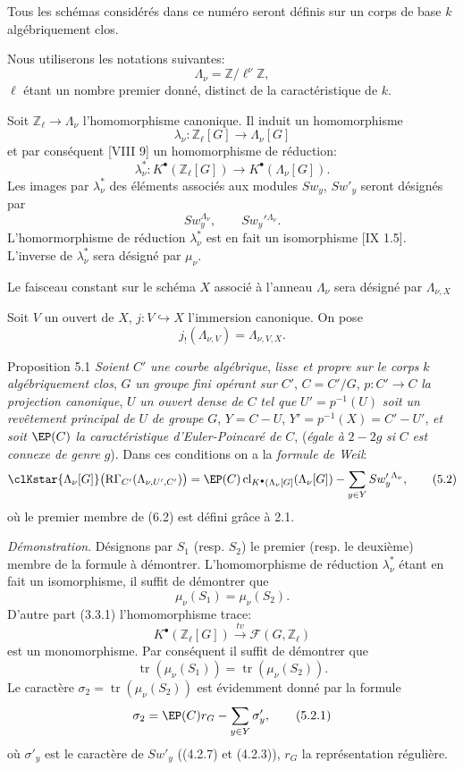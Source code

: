Tous les schémas considérés dans ce numéro seront définis sur un corps de base $k$ algébriquement clos.

Nous utiliserons les notations suivantes:
\[
\Lambda_\nu=\mathbb{Z}/\ell^\nu\mathbb{Z},
\]
$\ell$ étant un nombre premier donné, distinct de la caractéristique de $k$.

Soit $\mathbb{Z}_\ell\to\Lambda_\nu$ l'homomorphisme canonique. Il induit un homomorphisme
\[
\lambda_\nu:\mathbb{Z}_\ell[G]\longrightarrow \Lambda_\nu[G]
\]
et par conséquent [VIII 9] un homomorphisme de réduction:
\[
\lambda_\nu^*:K^{\bullet}(\mathbb{Z}_\ell[G])\longrightarrow K^{\bullet}(\Lambda_\nu[G]).
\]
Les images par $\lambda_\nu^*$ des éléments associés aux modules $Sw_y$, $Sw'_y$ seront désignés par
\[
Sw_y^{\Lambda_\nu},\qquad Sw_y'{}^{\Lambda_\nu}.
\]
L'homormorphisme de réduction $\lambda_\nu^*$ est en fait un isomorphisme [IX 1.5]. L'inverse de $\lambda_\nu^*$ sera désigné par $\mu_\nu$.

Le faisceau constant sur le schéma $X$ associé à l'anneau $\Lambda_\nu$ sera désigné par $\Lambda_{\nu,X}$

Soit $V$ un ouvert de $X$, $j:V\hookrightarrow X$ l'immersion canonique. On pose
\[
j_!(\Lambda_{\nu,V})=\Lambda_{\nu,V,X}.
\]

\begin{statement}{Proposition 5.1}
\emph{Soient} $C'$ \emph{une courbe algébrique}, \emph{lisse et propre sur le corps} $k$ \emph{algébriquement clos}, $G$ \emph{un groupe fini opérant sur} $C'$, $C=C'/G$, $p:C'\to C$ \emph{la projection canonique}, $U$ \emph{un ouvert dense de} $C$ \emph{tel que} $U'=p^{-1}(U)$ \emph{soit un revêtement principal de} $U$ \emph{de groupe} $G$, $Y=C-U$, $Y'=p^{-1}(X)=C'-U'$, \emph{et soit} $\EP(C)$ \emph{la caractéristique d'Euler-Poincaré de} $C$, (\emph{égale à} $2-2g$ \emph{si} $C$ \emph{est connexe de genre} $g$).
Dans ces conditions on a la \emph{formule de Weil}:
\[
\clKstar{\Lambda_\nu[G]}\bigl(\mathrm{R}\Gamma_{C'}(\Lambda_{\nu,U',C'})\bigr)
=
\EP(C)\operatorname{cl}_{K^{\bullet}(\Lambda_\nu[G]}(\Lambda_\nu[G])
-\sum_{y\in Y}Sw_y'{}^{\Lambda_\nu},
\tag{5.2}
\]
où le premier membre de (6.2) est défini grâce à 2.1.
\end{statement}

\emph{Démonstration}. Désignons par $S_1$ (resp. $S_2$) le premier (resp. le deuxième) membre de la formule à démontrer. L'homomorphisme de réduction $\lambda_\nu^*$ étant en fait un isomorphisme, il suffit de démontrer que
\[
\mu_\nu(S_1)=\mu_\nu(S_2).
\]
D'autre part (3.3.1) l'homomorphisme trace:
\[
K^{\bullet}(\mathbb{Z}_\ell[G])\xrightarrow{\ tv\ }\mathcal{F}(G,\mathbb{Z}_\ell)
\]
est un monomorphisme. Par conséquent il suffit de démontrer que
\[
\operatorname{tr}(\mu_\nu(S_1))=\operatorname{tr}(\mu_\nu(S_2)).
\]
Le caractère $\sigma_2=\operatorname{tr}(\mu_\nu(S_2))$ est évidemment donné par la
formule
\[
\sigma_2=\EP(C)r_G-\sum_{y\in Y}\sigma'_y,
\tag{5.2.1}
\]
où $\sigma'_y$ est le caractère de $Sw'_y$ ((4.2.7) et (4.2.3)), $r_G$ la représentation régulière.

